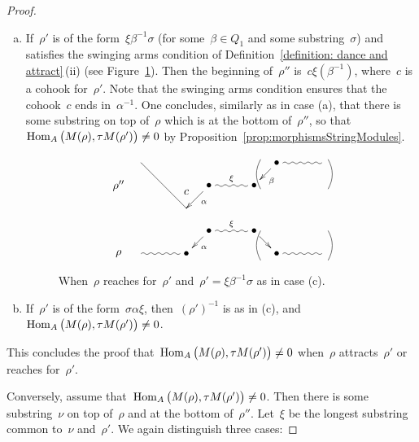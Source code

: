 \documentclass{memo-l}
\theoremstyle{definition}
\newcommand{\Hom}[1]{\operatorname{{\rm Hom}}_{#1}}
\begin{document}
\begin{proof}
\begin{enumerate}[(a)]
\item If~$\rho'$ is of the form~$\xi\beta^{-1}\sigma$ (for some~$\beta\in Q_1$ and some substring~$\sigma$) and satisfies the swinging arms condition of Definition~\ref{definition: dance and attract}\,(ii) (see Figure~\ref{fig:dance case c}).
 Then the beginning of~$\rho''$ is~$c\xi(\beta^{-1})$, where~$c$ is a cohook for~$\rho'$. Note that the swinging arms condition ensures that the cohook~$c$ ends in~$\alpha^{-1}$.
 One concludes, similarly as in case (a), that there is some substring on top of~$\rho$ which is at the bottom of~$\rho''$, so that~$\Hom{A} \big( M(\rho), \tau M(\rho') \big) \ne 0$ by Proposition~\ref{prop:morphismsStringModules}.
 
 \begin{figure}[h]
 	\capstart
\[
\xy
%
(-35,7)*+{\rho''};
(-28,14)="peak";
(-14,5)*+{c};
(-14,0)="-12";
(-7,7)*+{\bullet}="-11";
(7,7)*+{\bullet}="11";
(14,14)*+{\bullet}="12";
(28,14)="14";
%
(-35,-14)*+{\rho};
(-28,-14)="-4";
(-14,-14)*+{\bullet}="-2";
(-7,-7)*+{\bullet}="-1";
(7,-7)*+{\bullet}="1";
(14,-14)*+{\bullet}="2";
(28,-14)="4";
%
{\ar@{-} "peak";"-12"};
{\ar^{\alpha} "-11";"-12"};
{\ar@{~}^\xi "-11";"11"};
{\ar^{\beta} "12";"11"};
{\ar@{~} "12";"14"};
%
{\ar@/^.3pc/@{-} (30,15);(30,6)};
{\ar@/_.3pc/@{-} (9,15);(9,6)};
%
{\ar@/_.3pc/@{-} (30,-16);(30,-7)};
{\ar@/^.3pc/@{-} (9,-16);(9,-7)};
%
{\ar@{~} "-4";"-2"};
{\ar^{\alpha} "-1";"-2"};
{\ar@{~}^\xi "-1";"1"};
{\ar "1";"2"};
{\ar@{~} "2";"4"};
%
\endxy
\]
    \caption{When~$\rho$ reaches for~$\rho'$ and~$\rho'=\xi\beta^{-1}\sigma$ as in case (c).}
    \vspace{-.5cm}
    \label{fig:dance case c}
\end{figure}

\item If~$\rho'$ is of the form~$\sigma\alpha\xi$, then~$(\rho')^{-1}$ is as in (c), and~$\Hom{A} \big( M(\rho), \tau M(\rho') \big) \ne 0$.
\end{enumerate}
This concludes the proof that~$\Hom{A} \big( M(\rho), \tau M(\rho') \big) \ne 0$ when~$\rho$ attracts~$\rho'$ or reaches for~$\rho'$.

\bigskip
Conversely, assume that~$\Hom{A} \big( M(\rho), \tau M(\rho') \big) \ne 0$.
Then there is some substring~$\nu$ on top of~$\rho$ and at the bottom of~$\rho''$.
Let~$\xi$ be the longest substring common to~$\nu$ and~$\rho'$.
We again distinguish three cases:


\end{proof}
\end{document}
